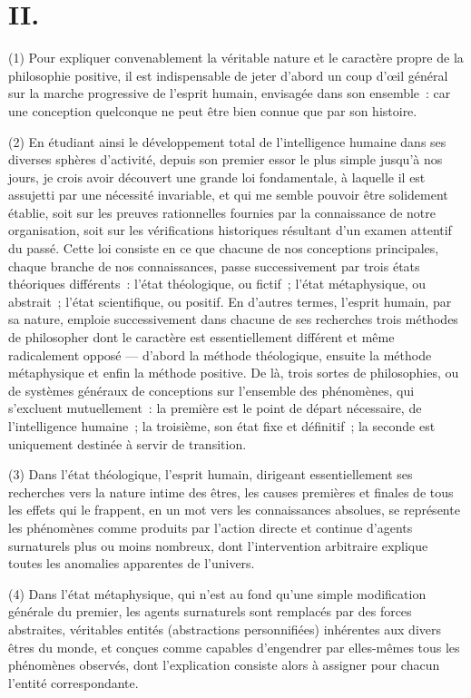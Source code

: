 \documentclass[french,twoside]{book} %
\begin{document}
\section[{II.}]{II.}
\noindent (1) Pour expliquer convenablement la véritable nature et le caractère propre de la philosophie positive, il est indispensable de jeter d’abord un coup d’œil général sur la marche progressive de l’esprit humain, envisagée dans son ensemble : car une conception quelconque ne peut être bien connue que par son histoire.\par
(2) En étudiant ainsi le développement total de l’intelligence humaine dans ses diverses sphères d’activité, depuis son premier essor le plus simple jusqu’à nos jours, je crois avoir découvert une grande loi fondamentale, à laquelle il est assujetti par une nécessité invariable, et qui me semble pouvoir être solidement établie, soit sur les preuves rationnelles fournies par la connaissance de notre organisation, soit sur les vérifications historiques résultant d’un examen attentif du passé. Cette loi consiste en ce que chacune de nos conceptions principales, chaque branche de nos connaissances, passe successivement par trois états théoriques différents : l’état théologique, ou fictif ; l’état métaphysique, ou abstrait ; l’état scientifique, ou positif. En d’autres termes, l’esprit humain, par sa nature, emploie successivement dans chacune de ses recherches trois méthodes de philosopher dont le caractère est essentiellement différent et même radicalement opposé — d’abord la méthode théologique, ensuite la méthode métaphysique et enfin la méthode positive. De là, trois sortes de philosophies, ou de systèmes généraux de conceptions sur l’ensemble des phénomènes, qui s’excluent mutuellement : la première est le point de départ nécessaire, de l’intelligence humaine ; la troisième, son état fixe et définitif ; la seconde est uniquement destinée à servir de transition.\par
(3) Dans l’état théologique, l’esprit humain, dirigeant essentiellement ses recherches vers la nature intime des êtres, les causes premières et finales de tous les effets qui le frappent, en un mot vers les connaissances absolues, se représente les phénomènes comme produits par l’action directe et continue d’agents surnaturels plus ou moins nombreux, dont l’intervention arbitraire explique toutes les anomalies apparentes de l’univers.\par
(4) Dans l’état métaphysique, qui n’est au fond qu’une simple modification générale du premier, les agents surnaturels sont remplacés par des forces abstraites, véritables entités (abstractions personnifiées) inhérentes aux divers êtres du monde, et conçues comme capables d’engendrer par elles-mêmes tous les phénomènes observés, dont l’explication consiste alors à assigner pour chacun l’entité correspondante.\par
\end{document}
